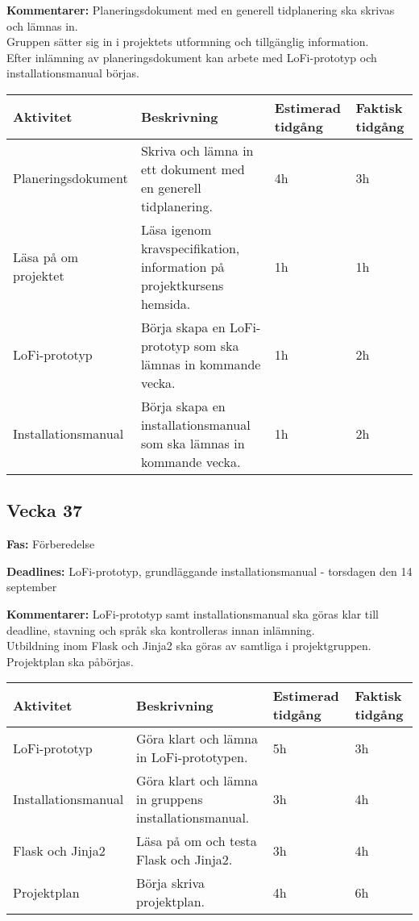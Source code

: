 \documentclass{TDP003mall}
\begin{document}
\textbf{Kommentarer:}
Planeringsdokument med en generell tidplanering ska skrivas och lämnas in.\\
Gruppen sätter sig in i projektets utformning och tillgänglig information.\\
Efter inlämning av planeringsdokument kan arbete med LoFi-prototyp och installationsmanual börjas.
\\

\begin{table}[!h]
\renewcommand{\arraystretch}{1.5}
\begin{tabularx}{\linewidth}{|l|X|l|l|}
\hline
\textbf{Aktivitet} & \textbf{Beskrivning} & \textbf{Estimerad tidgång} & \textbf{Faktisk tidgång}\\
\hline
Planeringsdokument & Skriva och lämna in ett dokument med en generell tidplanering. & 4h & 3h \\
\hline
Läsa på om projektet & Läsa igenom kravspecifikation, information på projektkursens hemsida. & 1h & 1h\\
\hline
LoFi-prototyp & Börja skapa en LoFi-prototyp som ska lämnas in kommande vecka. & 1h & 2h\\
\hline
Installationsmanual & Börja skapa en installationsmanual som ska lämnas in kommande vecka. & 1h  & 2h\\
\hline

\end{tabularx}
\end{table}


\subsection{Vecka 37}

\textbf{Fas:} Förberedelse

\textbf{Deadlines:} LoFi-prototyp, grundläggande installationsmanual - torsdagen den 14 september

\textbf{Kommentarer:}
LoFi-prototyp samt installationsmanual ska göras klar till deadline, stavning och språk ska kontrolleras innan inlämning.\\ Utbildning inom Flask och Jinja2 ska göras av samtliga i projektgruppen. \\Projektplan ska påbörjas.\\

\begin{table}[H]
\renewcommand{\arraystretch}{1.5}
\begin{tabularx}{\linewidth}{|l|X|l|l|}
\hline
\textbf{Aktivitet} & \textbf{Beskrivning} & \textbf{Estimerad tidgång} & \textbf{Faktisk tidgång}\\
\hline
LoFi-prototyp & Göra klart och lämna in LoFi-prototypen. & 5h  & 3h \\
\hline
Installationsmanual & Göra klart och lämna in gruppens installationsmanual. & 3h & 4h \\
\hline
Flask och Jinja2 & Läsa på om och testa Flask och Jinja2. & 3h  & 4h \\
\hline
Projektplan & Börja skriva projektplan. & 4h & 6h \\
\hline

\end{tabularx}
\end{table}
\end{document}
